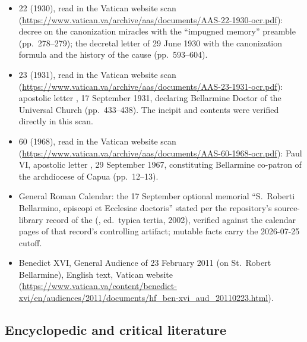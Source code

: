 \begin{itemize}
\item {} 22 (1930), read in the Vatican website scan
(\url{https://www.vatican.va/archive/aas/documents/AAS-22-1930-ocr.pdf}):
decree on the canonization miracles with the ``impugned memory''
preamble (pp.~278--279); the decretal letter  of
29 June 1930 with the canonization formula and the history of the
cause (pp.~593--604).
\item {} 23 (1931), read in the Vatican website scan
(\url{https://www.vatican.va/archive/aas/documents/AAS-23-1931-ocr.pdf}):
apostolic letter , 17 September 1931,
declaring Bellarmine Doctor of the Universal Church
(pp.~433--438). The incipit and contents were verified directly
in this scan.
\item {} 60 (1968), read in the Vatican website scan
(\url{https://www.vatican.va/archive/aas/documents/AAS-60-1968-ocr.pdf}):
Paul VI, apostolic letter , 29 September 1967,
constituting Bellarmine co-patron of the archdiocese of Capua
(pp.~12--13).
\item General Roman Calendar: the 17 September optional memorial
``S.~Roberti Bellarmino, episcopi et Ecclesiae doctoris'' stated
per the repository's source-library record of the
 (, ed.\
typica tertia, 2002), verified against the calendar pages of that
record's controlling artifact; mutable facts carry the 2026-07-25
cutoff.
\item Benedict XVI, General Audience of 23 February 2011 (on
St.~Robert Bellarmine), English text, Vatican website
(\url{https://www.vatican.va/content/benedict-xvi/en/audiences/2011/documents/hf_ben-xvi_aud_20110223.html}).
\end{itemize}

\subsection*{Encyclopedic and critical literature}

